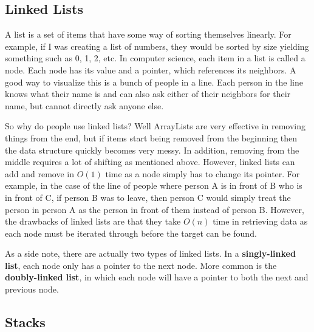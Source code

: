 \subsection{Linked Lists}

A list is a set of items that have some way of sorting themselves linearly. For example, if I was creating a list of numbers, they would be sorted by size yielding something such as 0, 1, 2, etc. In computer science, each item in a list is called a node. Each node has its value and a pointer, which references its neighbors. A good way to visualize this is a bunch of people in a line. Each person in the line knows what their name is and can also ask either of their neighbors for their name, but cannot directly ask anyone else.

So why do people use linked lists? Well ArrayLists are very effective in removing things from the end, but if items start being removed from the beginning then the data structure quickly becomes very messy. In addition, removing from the middle requires a lot of shifting as mentioned above. However, linked lists can add and remove in $O(1)$ time as a node simply has to change its pointer. For example, in the case of the line of people where person A is in front of B who is in front of C, if person B was to leave, then person C would simply treat the person in person A as the person in front of them instead of person B. However, the drawbacks of linked lists are that they take $O(n)$ time in retrieving data as each node must be iterated through before the target can be found.


As a side note, there are actually two types of linked lists. In a \textbf{singly-linked list}, each node only has a pointer to the next node. More common is the \textbf{doubly-linked list}, in which each node will have a pointer to both the next and previous node.


\subsection{Stacks}

